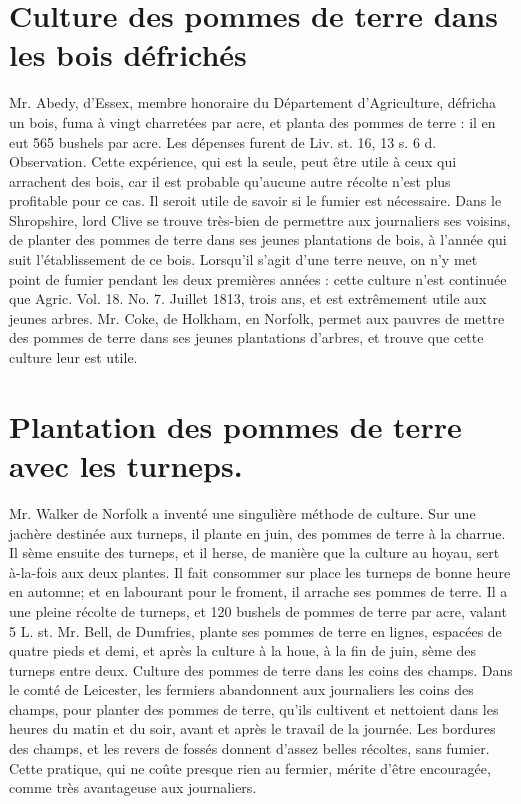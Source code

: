 \section{Culture des pommes de terre dans les bois défrichés}
Mr. Abedy, d'Essex, membre honoraire du Département d'Agriculture, défricha un bois, fuma à vingt charretées par acre, et planta des pommes de terre : il en eut 565 bushels par acre. Les dépenses furent de Liv. st. 16, 13 s. 6 d.
Observation.
Cette expérience, qui est la seule, peut être utile à ceux qui arrachent des bois, car il est probable qu'aucune autre récolte n'est plus profitable pour ce cas. Il seroit utile de savoir si le fumier est nécessaire.
Dans le Shropshire, lord Clive se trouve très-bien de permettre aux journaliers ses voisins, de planter des pommes de terre dans ses jeunes plantations de bois, à l'année qui suit l'établissement de ce bois. Lorsqu'il s'agit d'une terre neuve, on n'y met point de fumier pendant les deux premières années : cette culture n'est continuée que Agric. Vol. 18. No. 7. Juillet 1813,\setcounter{page}{274} trois ans, et est extrêmement utile aux jeunes arbres.
Mr. Coke, de Holkham, en Norfolk, permet aux pauvres de mettre des pommes de terre dans ses jeunes plantations d’arbres, et trouve que cette culture leur est utile.
\section{Plantation des pommes de terre avec les turneps.}
Mr. Walker de Norfolk a inventé une singulière méthode de culture. Sur une jachère destinée aux turneps, il plante en juin, des pommes de terre à la charrue. Il sème ensuite des turneps, et il herse, de manière que la culture au hoyau, sert à-la-fois aux deux plantes. Il fait consommer sur place les turneps de bonne heure en automne; et en labourant pour le froment, il arrache ses pommes de terre. Il a une pleine récolte de turneps, et 120 bushels de pommes de terre par acre, valant 5 L. st.
Mr. Bell, de Dumfries, plante ses pommes de terre en lignes, espacées de quatre pieds et demi, et après la culture à la houe, à la fin de juin, sème des turneps entre deux.\setcounter{page}{275} Culture des pommes de terre dans les coins des champs.
Dans le comté de Leicester, les fermiers abandonnent aux journaliers les coins des champs, pour planter des pommes de terre, qu'ils cultivent et nettoient dans les heures du matin et du soir, avant et après le travail de la journée. Les bordures des champs, et les revers de fossés donnent d'assez belles récoltes, sans fumier. Cette pratique, qui ne coûte presque rien au fermier, mérite d'être encouragée, comme très avantageuse aux journaliers.
